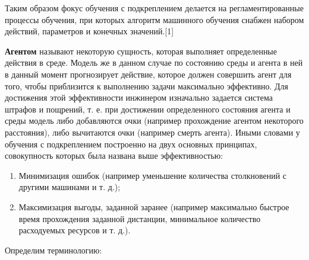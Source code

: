 \documentclass[bachelor, och, referat]{shiza}
\begin{document}
Таким образом фокус обучения с подкреплением делается на регламентированные процессы обучения, при которых алгоритм машинного обучения снабжен набором действий, параметров и конечных значений.[1]

\textbf{Агентом} называют некоторую сущность, которая выполняет определенные действия в среде. Модель же в данном случае по состоянию среды и агента в ней
в данный момент прогнозирует действие, которое должен совершить агент для того, чтобы приблизится к выполнению задачи максимально эффективно. Для достижения
этой эффективности инжинером изначально задается система штрафов и пощрений, т. е. при достижении определенного состояния агента и среды модель либо добавляются очки
(например прохождение агентом некоторого расстояния), либо вычитаются очки (например смерть агента). Иными словами у обучения с подкреплением построенно на двух
основных принципах, совокупность которых была названа выше эффективностью:

\begin{enumerate}
    \item Минимизация ошибок (например уменьшение количества столкновений с другими машинами и т. д.);
    \item Максимизация выгоды, заданной заранее (например максимально быстрое время прохождения заданной дистанции, минимальное количество расходуемых ресурсов и т. д.).
\end{enumerate}

Определим терминологию:
\end{document}
